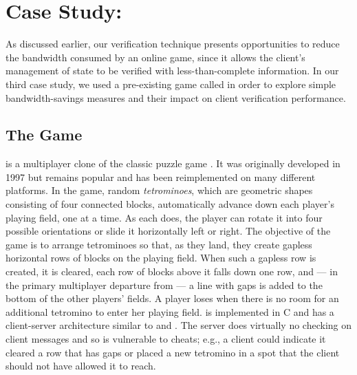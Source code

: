 \section{Case Study: \tetrinet}
\label{sec:scv:bandwidth}

As discussed earlier, our verification technique
presents opportunities to reduce the bandwidth consumed by an online
game, since it allows the client's management of state to be verified
with less-than-complete information.
In our third case study, we used a pre-existing game called \tetrinet
in order to explore simple bandwidth-savings measures and their impact
on client verification performance.

\subsection{The Game}
\tetrinet is a multiplayer clone of the classic puzzle game \tetris.
It was originally developed in 1997 but remains popular and has been
reimplemented on many different platforms.  In the game, random
\textit{tetrominoes}, which are geometric shapes consisting of four
connected blocks, automatically advance down each player's playing
field, one at a time.  As each does, the player can rotate it into
four possible orientations or slide it horizontally left or right.
The objective of the game is to arrange tetrominoes so that, as they
land, they create gapless horizontal rows of blocks on the playing
field.  When such a gapless row is created, it is cleared, each row of
blocks above it falls down one row, and --- in the primary multiplayer
departure from \tetris{} --- a line with gaps is added to the bottom
of the other players' fields.  A player loses when there is no room
for an additional tetromino to enter her playing field.  \tetrinet is
implemented in C and has a client-server architecture similar to
\capman and \xpilot.  The server does virtually no checking on client
messages and so is vulnerable to cheats; e.g., a client could indicate
it cleared a row that has gaps or placed a new tetromino in a spot
that the client should not have allowed it to reach.

